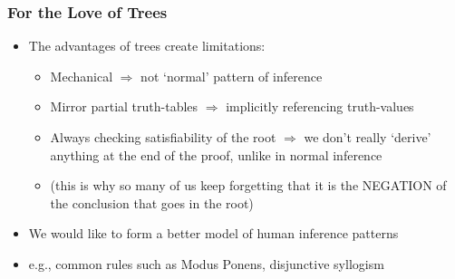 \begin{frame}
\frametitle{For the Love of Trees}

\begin{itemize}[<+->]

\item The advantages of trees create limitations:

\begin{itemize}

\item Mechanical $\Rightarrow$ not `normal' pattern of inference

\item Mirror partial truth-tables $\Rightarrow$ implicitly referencing truth-values

\item Always checking satisfiability of the root $\Rightarrow$ we don't really `derive' anything at the end of the proof, unlike in normal inference 

\item (this is why so many of us keep forgetting that it is the NEGATION of the conclusion that goes in the root)

\end{itemize}

\item We would like to form a better model of human inference patterns

\item e.g., common rules such as Modus Ponens, disjunctive syllogism

\end{itemize}
\end{frame}

